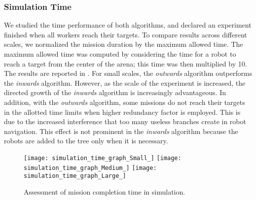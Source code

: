 \subsubsection{Simulation Time}
We studied the time performance of both algorithms, and declared an
experiment finished when all workers reach their targets. To compare
results across different scales, we normalized the mission duration by
the maximum allowed time. The maximum allowed time was computed by
considering the time for a robot to reach a target from the center of
the arena; this time was then multiplied by 10. The results are
reported in . For small scales, the \emph{outwards}
algorithm outperforms the \emph{inwards} algorithm. However, as the
scale of the experiment is increased, the directed growth of the
\emph{inwards} algorithm is increasingly advantageous. In addition,
with the \emph{outwards} algorithm, some missions do not reach their
targets in the allotted time limits when higher redundancy factor is
employed. This is due to the increased interference that too many
useless branches create in robot navigation. This effect is not
prominent in the \emph{inwards} algorithm because the robots are added
to the tree only when it is necessary.
\begin{figure*}[t]
    \centering
    \texttt{[image: simulation\_time\_graph\_Small\_]}
    \texttt{[image: simulation\_time\_graph\_Medium\_]}
    \texttt{[image: simulation\_time\_graph\_Large\_]}
    \caption{Assessment of mission completion time in simulation.}
    \label{fig:sim_time}
\end{figure*}

